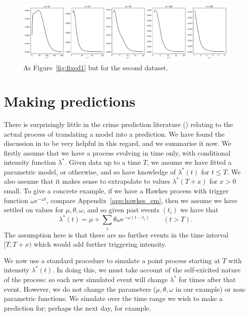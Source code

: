 \documentclass[twoside,a4paper]{article}
\theoremstyle{plain}
\theoremstyle{definition}
\begin{document}
\begin{figure}
  \includegraphics[width=\textwidth]{../notebooks/fixed_grid_mod_1.pdf}
  \caption{As Figure~\ref{fig:fixed1} but for the second dataset.}
  \label{fig:fixed1mod}
\end{figure}



\section{Making predictions}\label{sec:making_preds}

There is surprisingly little in the crime prediction literature (\cite{sepp, sepp2, rc})
relating to the actual process of translating a model into a prediction.  We have found
the discussion in \cite[Section~1]{vj} to be very helpful in this regard, and we summarise
it now.  We firstly assume that we have a process evolving in time only, with conditional
intensity function $\lambda^*$.  Given data up to a time $T$, we assume we have fitted a
parametric model, or otherwise, and so have knowledge of $\lambda^*(t)$ for $t\leq T$.
We also assume that it makes sense to extrapolate to values $\lambda^*(T+x)$ for $x>0$ small.
To give a concrete example, if we have a Hawkes process with trigger function
$\omega e^{-\omega t}$, compare Appendix~\ref{app:hawkes_em}, then we assume we have settled
on values for $\mu, \theta, \omega$, and so given past events $(t_i)$ we have that
\[ \lambda^*(t) = \mu + \sum_i \theta \omega e^{-\omega (t-t_i)}
\qquad (t>T). \]
The assumption here is that there are no further events in the time interval $[T, T+x)$ which
would add further triggering intensity.

We now use a standard procedure to simulate a point process starting at $T$ with intensity
$\lambda^*(t)$.  In doing this, we must take account of the self-exicited nature of the
process: so each new simulated event will change $\lambda^*$ for times after that event.
However, we do not change the parameters ($\mu, \theta, \omega$ in our example) or non-parametric
functions.  We simulate over the time range we wish to make a prediction for; perhaps the
next day, for example.
\end{document}
